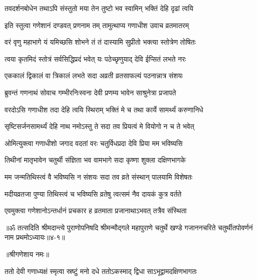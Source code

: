 \twolineshloka
{तवदर्शनबोधेन तथाऽपि संस्तुतो मया}
{तेन तुष्टो भव स्वामिन् भक्तिं देहि दृढां त्वयि} %

\twolineshloka
{इति स्तुत्वा गणेशानं दण्डवत् प्रणनाम तम्}
{तामुत्थाप्य गणाधीश उवाच व्रतमातरम्} %


\twolineshloka
{वरं वृणु महाभागे यं यमिच्छसि शोभने}
{तं तं दास्यामि सुप्रीतो भक्त्या स्तोत्रेण तोषितः} %

\twolineshloka
{त्वया कृतमिदं स्तोत्रं सर्वसिद्धिप्रदं भवेत्}
{यः पठेच्छृणुयाद् देवि ईप्सितं लभते नरः} %

\twolineshloka
{एककालं द्विकालं वा त्रिकालं लभते सदा}
{अव्रती व्रतसाफल्यं पठनान्नात्र संशयः} %

\twolineshloka
{ब्रुवन्तं गणनाथं सोवाच गम्भीरनिःस्वना}
{देवी प्रणम्य भावेन साश्रुनेत्रा प्रजापते} %


\twolineshloka
{वरदोऽसि गणाधीश तदा देहि त्वयि स्थिराम्}
{भक्तिं मे च तथा कार्ये सामर्थ्यं करुणानिधे} %

\twolineshloka
{सृष्टिसर्जनसामर्थ्यं देहि नाथ नमोऽस्तु ते}
{सदा तव प्रियत्वं मे वियोगो न च ते भवेत्} %

\twolineshloka
{ओमित्युक्त्वा गणाधीशो जगाद वदतां वरः}
{चतुर्विधप्रदा देवि प्रिया मम भविष्यसि} %

\twolineshloka
{तिथीनां मातृभावेन चतुर्थी संज्ञिता भव}
{वामभागे सदा कृष्णा शुक्ला दक्षिणभागके} %

\twolineshloka
{मम जन्मतिथिस्त्वं वै भविष्यसि न संशयः}
{सदा तव व्रते संस्थान् पालयामि विशेषतः} %

\twolineshloka
{मदीयव्रतजा पुण्या तिथिस्त्वं च भविष्यसि}
{व्रतेषु त्वत्समं नैव दायकं कुत्र वर्तते} %

\twolineshloka
{एवमुक्त्वा गणेशानोऽन्तर्धानं प्रचकार ह}
{व्रतमाता प्रजानाथाऽभवत् तत्रैव संस्थिता} %

॥ॐ तत्सदिति श्रीमदान्त्ये पुराणोपनिषदि श्रीमन्मौद्गले महापुराणे चतुर्थे खण्डे गजाननचरिते चतुर्थीतपोवर्णनं नाम प्रथमोऽध्यायः॥४-१॥


\label{sec:shukla--krishna-chaturthi-varadana-varnanam}

\centerline{॥श्रीगणेशाय नमः॥}


\twolineshloka
{ततो देवी गणाध्यक्षं स्मृत्वा स्रष्टुं मनो दधे}
{ततोऽकस्माद् द्विधा साऽभूद्वामदक्षिणभागतः} %

